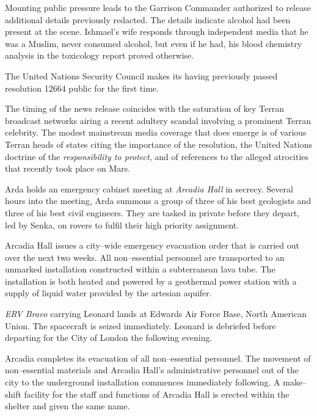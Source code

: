 Mounting public pressure leads to the Garrison Commander authorized to release additional details previously redacted. The details indicate alcohol had been present at the scene. Ishmael's wife responds through independent media that he was a Muslim, never consumed alcohol, but even if he had, his blood chemistry analysis in the toxicology report proved otherwise.
\StopTimelineDate

The United Nations Security Council makes its having previously passed resolution 12664 public for the first time. 

The timing of the news release coincides with the saturation of key Terran broadcast networks airing a recent adultery scandal involving a prominent Terran celebrity. The modest mainstream media coverage that does emerge is of various Terran heads of states citing the importance of the resolution, the United Nations doctrine of the {\it responsibility to protect}, and of references to the alleged atrocities that recently took place on Mars.
\StopTimelineDate

Arda holds an emergency cabinet meeting at {\it Arcadia Hall} in secrecy. Several hours into the meeting, Arda summons a group of three of his best geologists and three of his best civil engineers. They are tasked in private before they depart, led by Senka, on rovers to fulfil their high priority assignment.
\StopTimelineDate

Arcadia Hall issues a city--wide emergency evacuation order that is carried out over the next two weeks. All non--essential personnel are transported to an unmarked installation constructed within a subterranean lava tube. The installation is both heated and powered by a geothermal power station with a supply of liquid water provided by the artesian aquifer.
\StopTimelineDate

{\it ERV Bravo} carrying Leonard lands at Edwards Air Force Base, North American Union. The spacecraft is seized immediately. Leonard is debriefed before departing for the City of London the following evening.
\StopTimelineDate

Arcadia completes its evacuation of all non--essential personnel. The movement of non--essential materials and Arcadia Hall's administrative personnel out of the city to the underground installation commences immediately following. A make--shift facility for the staff and functions of Arcadia Hall is erected within the shelter and given the same name.

